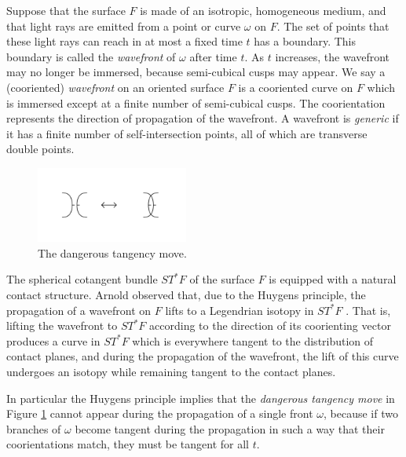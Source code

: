 
Suppose that the surface $F$ is made of an isotropic, homogeneous medium, and that light rays are emitted from a point or curve $\omega$ on $F$.  The set of points that these light rays can reach in at most a fixed time $t$ has a boundary.  This boundary is called the {\it wavefront} of $\omega$ after time $t$.  As $t$ increases, the wavefront may no longer be immersed, because semi-cubical cusps may appear.  We say a (cooriented) {\it wavefront} on an oriented surface $F$ is a cooriented curve on $F$ which is immersed except at a finite number of semi-cubical cusps.  The coorientation represents the direction of propagation of the wavefront.  A wavefront is {\it generic} if it has a finite number of self-intersection points, all of which are transverse double points.  


\begin{figure}[htbp]\label{dangerous.fig}
	\includegraphics[width=5cm]{dangerousTangencyMove}
	\caption{The dangerous tangency move.}
\end{figure}

The spherical cotangent bundle $ST^*F$ of the surface $F$ is equipped with a natural contact structure.  Arnold observed that, due to the Huygens principle, the propagation of a wavefront on $F$ lifts to a Legendrian isotopy in $ST^*F$ \cite{ArnoldMechanics, ArnoldPDE}.  That is, lifting the wavefront to $ST^*F$ according to the direction of its coorienting vector produces a curve in $ST^*F$ which is everywhere tangent to the distribution of contact planes, and during the propagation of the wavefront, the lift of this curve undergoes an isotopy while remaining tangent to the contact planes.  

In particular the Huygens principle implies that the {\it dangerous tangency move} in Figure \ref{dangerous.fig} cannot appear during the propagation of a single front $\omega$, because if two branches of $\omega$ become tangent during the propagation in such a way that their coorientations match, they must be tangent for all $t$.


